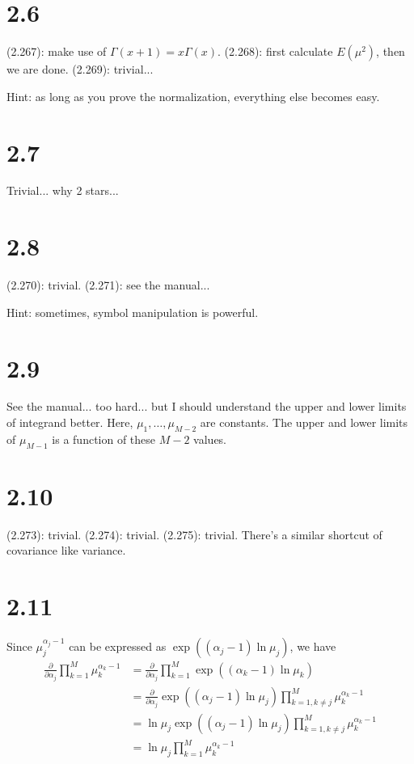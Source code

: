 \documentclass[12pt]{article}
\begin{document}
\section{2.6}
(2.267): make use of $\Gamma(x+1) = x \Gamma(x)$.
(2.268): first calculate $E(\mu^2)$, then we are done.
(2.269): trivial...

Hint: as long as you prove the normalization, everything else becomes easy.

\section{2.7}
Trivial... why 2 stars...

\section{2.8}
(2.270): trivial.
(2.271): see the manual... 

Hint: sometimes, symbol manipulation is powerful.

\section{2.9}
See the manual... too hard... but I should understand the upper and lower limits of integrand better. Here, $\mu_1,\ldots,\mu_{M-2}$ are constants. The upper and lower limits of $\mu_{M-1}$ is a function of these $M-2$ values.

\section{2.10}
(2.273): trivial.
(2.274): trivial.
(2.275): trivial. There's a similar shortcut of covariance like variance.

\section{2.11}
Since $\mu_j^{\alpha_j -1}$ can be expressed as $\exp((\alpha_j-1) \ln\mu_j)$, we have
\begin{align}
    \frac{\partial}{\partial \alpha_j}\prod_{k=1}^{M} \mu_k^{\alpha_k-1} & = \frac{\partial}{\partial \alpha_j}\prod_{k=1}^{M} \exp((\alpha_k-1)\ln\mu_k) \\
    & = \frac{\partial}{\partial \alpha_j} \exp((\alpha_j-1) \ln\mu_j)  \prod_{k=1,k \neq j}^{M} \mu_k^{\alpha_k-1} \\
    & = \ln \mu_j \exp((\alpha_j-1) \ln\mu_j)  \prod_{k=1,k\neq j}^{M} \mu_k^{\alpha_k-1} \\
    & = \ln \mu_j \prod_{k=1}^{M} \mu_k^{\alpha_k - 1}
\end{align}
\end{document}
